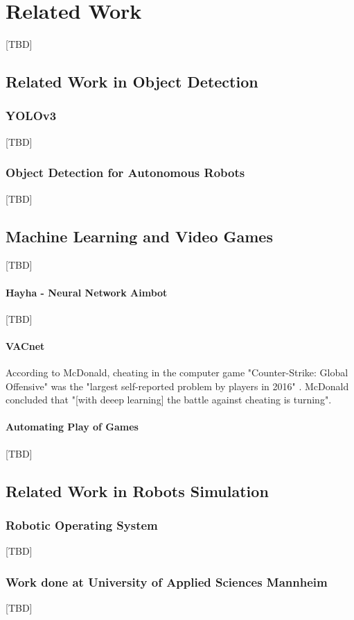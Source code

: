 \chapter{Related Work}
[TBD]

\section{Related Work in Object Detection}
\subsection{YOLOv3}
[TBD]\cite{yolov3}

\subsection{Object Detection for Autonomous Robots}
[TBD]\cite{Schweitzer2017}


\section{Machine Learning and Video Games}
[TBD]
\subsubsection{Hayha - Neural Network Aimbot}
[TBD]\cite{Hayha}

\subsubsection{VACnet}
According to McDonald, cheating in the computer game "Counter-Strike: Global Offensive" was the "largest self-reported problem by players in 2016" \cite{VACnet}. McDonald concluded that "[with deeep learning] the battle against cheating is turning".


\subsubsection{Automating Play of Games}
[TBD]\cite{Tom13thefirst}\cite{Togelius09supermario} %

\section{Related Work in Robots Simulation}

\subsection{Robotic Operating System}
[TBD]\cite{rosSite}

\subsection{Work done at University of Applied Sciences Mannheim}
[TBD]\cite{Seufert2009}

